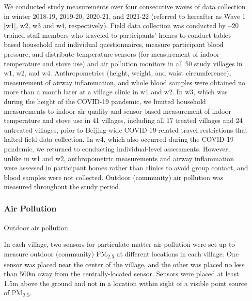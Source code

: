 \documentclass[
  letterpaper,
  DIV=11,
  numbers=noendperiod]{scrartcl}
\makeatletter
\let\oldparagraph\paragraph
\renewcommand{\paragraph}{
    \@ifstar
      \xxxParagraphStar
      \xxxParagraphNoStar
  }
\newcommand{\xxxParagraphStar}[1]{\oldparagraph*{#1}\mbox{}}
\newcommand{\xxxParagraphNoStar}[1]{\oldparagraph{#1}\mbox{}}
\makeatother
\begin{document}
We conducted study measurements over four consecutive waves of data
collection in winter 2018-19, 2019-20, 2020-21, and 2021-22 (referred to
hereafter as Wave 1 {[}w1{]}, w2, w3 and w4, respectively). Field data
collection was conducted by \textasciitilde20 trained staff members who
traveled to participants' homes to conduct tablet-based household and
individual questionnaires, measure participant blood pressure, and
distribute temperature sensors (for measurement of indoor temperature
and stove use) and air pollution monitors in all 50 study villages in
w1, w2, and w4. Anthropometrics (height, weight, and waist
circumference), measurement of airway inflammation, and whole blood
samples were obtained no more than a month later at a village clinic in
w1 and w2. In w3,  which was during the height of the
COVID-19 pandemic, we limited household measurements to indoor air
quality and sensor-based measurement of indoor temperature and stove use
in 41 villages, including all 17 treated villages and 24 untreated
villages, prior to Beijing-wide COVID-19-related travel restrictions
that halted field data collection. In w4, which also occurred during the
COVID-19 pandemic, we returned to conducting individual-level
assessments. However, unlike in w1 and w2, anthropometric measurements
and airway inflammation were assessed in participant homes rather than
clinics to avoid group contact, and blood samples were not collected.
Outdoor (community) air pollution was measured throughout the study
period.

\subsubsection{Air Pollution}\label{air-pollution}

\paragraph{Outdoor air pollution}\label{outdoor-air-pollution}

In each village, two sensors for particulate matter air pollution were
set up to measure outdoor (community) PM\textsubscript{2.5} at different
locations in each village. One sensor was placed near the center of the
village, and the other was placed no less than 500m away from the
centrally-located sensor. Sensors were placed at least 1.5m above the
ground and not in a location within sight of a visible point source of
PM\textsubscript{2.5}.
\end{document}
